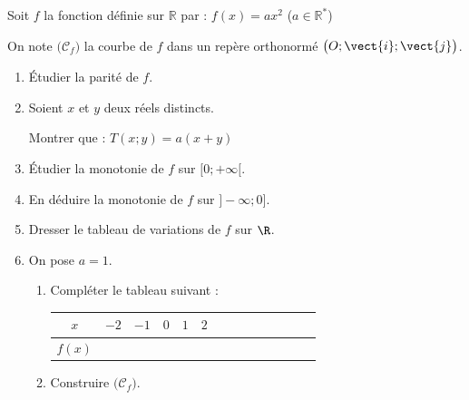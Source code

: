 \begin{Activite}[][10 min]
Soit $f$ la fonction définie sur $\mathbb{R}$ par : $f(x) = ax^2$ \quad ($a \in \mathbb{R}^*$)

On note $\big(\mathcal{C}_f\big)$ la courbe de $f$ dans un repère orthonormé $\big(O; \vect{i}; \vect{j}\big)$.
\begin{multicols}{2}
\begin{enumerate}
    \item Étudier la parité de $f$.
    \item Soient $x$ et $y$ deux réels distincts. 
    
    Montrer que : \quad $T(x;y) = a(x+y) $
    \item Étudier la monotonie de $f$ sur $[0 ; +\infty[$.
    \item En déduire la monotonie de $f$ sur $]-\infty ; 0]$.
    \item Dresser le tableau de variations de $f$ sur $\R$.
    \item On pose $a=1$.
    \begin{enumerate}
        \item Compléter le tableau suivant :
        \vspace{0.1cm}
         \begin{center}
            \renewcommand{\arraystretch}{1.2}
            \begin{tabular}{|Sc|*{6}{Sc|}}
                \hline
                $x$    & $-2$ & $-1$ & $0$ & $1$ & $2$  \\ \hline
                $f(x)$ &       &       &     &   &    \\ 
                \hline
            \end{tabular}
        \end{center}
        \vspace{0.1cm}
        \item Construire $\big(\mathcal{C}_f\big)$.
    \end{enumerate}
\end{enumerate}
\end{multicols}
\end{Activite}
